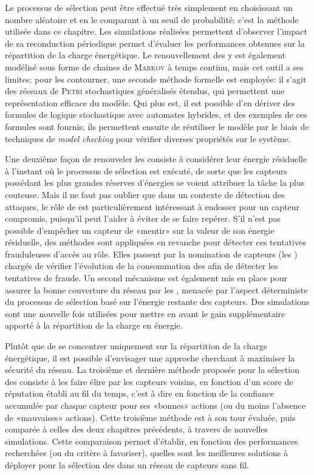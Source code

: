 Le processus de sélection peut être effectué très simplement en choisissant un nombre aléatoire et en le comparant à un seuil de probabilité: c'est la méthode utilisée dans ce chapitre.
Les simulations réalisées permettent d'observer l'impact de sa reconduction périodique permet d'évaluer les performances obtenues sur la répartition de la charge énergétique.
Le renouvellement des \cnst y est également modélisé sous forme de chaines de \textsc{Markov} à temps continu, mais cet outil a ses limites; pour les contourner, une seconde méthode formelle est employée: il s'agit des réseaux de \textsc{Petri} stochastiques généralisés étendus, qui permettent une représentation efficace du modèle.
Qui plus est, il est possible d'en dériver des formules de logique stochastique avec automates hybrides, et des exemples de ces formules sont fournis; ils permettent ensuite de réutiliser le modèle par le biais de techniques de \textit{model checking} pour vérifier diverses propriétés sur le système.

Une deuxième façon de renouveler les \cnst consiste à considérer leur énergie résiduelle à l'instant où le processus de sélection est exécuté, de sorte que les capteurs possédant les plus grandes réserves d'énergies se voient attribuer la tâche la plus couteuse.
Mais il ne faut pas oublier que dans un contexte de détection des attaques, le rôle de \cnt est particulièrement intéressant à endosser pour un capteur compromis, puisqu'il peut l'aider à éviter de se faire repérer.
S'il n'est pas possible d'empêcher un capteur de «mentir» sur la valeur de son énergie résiduelle, des méthodes sont appliquées en revanche pour détecter ces tentatives frauduleuses d'accès au rôle.
Elles passent par la nomination de capteurs (les \vnst) chargés de vérifier l'évolution de la consommation des \cnst afin de détecter les tentatives de fraude.
Un second mécanisme est également mis en place pour assurer la bonne couverture du réseau par les \cnst, menacée par l'aspect déterministe du processus de sélection basé sur l'énergie restante des capteurs.
Des simulations sont une nouvelle fois utilisées pour mettre en avant le gain supplémentaire apporté à la répartition de la charge en énergie.

Plutôt que de se concentrer uniquement sur la répartition de la charge énergétique, il est possible d'envisager une approche cherchant à maximiser la sécurité du réseau.
La troisième et dernière méthode proposée pour la sélection des \cnst consiste à les faire élire par les capteurs voisins, en fonction d'un score de réputation établi au fil du temps, c'est à dire en fonction de la confiance accumulée par chaque capteur pour ses «bonnes» actions (ou du moins l'absence de «mauvaises» actions).
Cette troisième méthode est à son tour évaluée, puis comparée à celles des deux chapitres précédents, à travers de nouvelles simulations.
Cette comparaison permet d'établir, en fonction des performances recherchées (ou du critère à favoriser), quelles sont les meilleures solutions à déployer pour la sélection des \cnst dans un réseau de capteurs sans fil.

